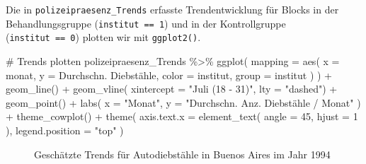 \documentclass[
  a4paper,
  DIV=11,
  oneside]{scrreprt}
\newenvironment{Shaded}{\begin{snugshade}}{\end{snugshade}}
\newcommand{\AttributeTok}[1]{\textcolor[rgb]{0.40,0.45,0.13}{#1}}
\newcommand{\CommentTok}[1]{\textcolor[rgb]{0.37,0.37,0.37}{#1}}
\newcommand{\DecValTok}[1]{\textcolor[rgb]{0.68,0.00,0.00}{#1}}
\newcommand{\FunctionTok}[1]{\textcolor[rgb]{0.28,0.35,0.67}{#1}}
\newcommand{\NormalTok}[1]{\textcolor[rgb]{0.00,0.23,0.31}{#1}}
\newcommand{\SpecialCharTok}[1]{\textcolor[rgb]{0.37,0.37,0.37}{#1}}
\newcommand{\StringTok}[1]{\textcolor[rgb]{0.13,0.47,0.30}{#1}}
\begin{document}
Die in \texttt{polizeipraesenz\_Trends} erfasste Trendentwicklung für
Blocks in der Behandlungsgruppe (\texttt{institut\ ==\ 1}) und in der
Kontrollgruppe (\texttt{institut\ ==\ 0}) plotten wir mit
\texttt{ggplot2()}.

\begin{Shaded}
\begin{Highlighting}[]
\CommentTok{\# Trends plotten}
\NormalTok{polizeipraesenz\_Trends }\SpecialCharTok{\%\textgreater{}\%}
  \FunctionTok{ggplot}\NormalTok{(}
    \AttributeTok{mapping =} \FunctionTok{aes}\NormalTok{(}
      \AttributeTok{x =}\NormalTok{ monat, }
      \AttributeTok{y =} \StringTok{\textasciigrave{}}\AttributeTok{Durchschn. Diebstähle}\StringTok{\textasciigrave{}}\NormalTok{, }
      \AttributeTok{color =}\NormalTok{ institut, }
      \AttributeTok{group =}\NormalTok{ institut}
\NormalTok{    )}
\NormalTok{  ) }\SpecialCharTok{+}
  \FunctionTok{geom\_line}\NormalTok{() }\SpecialCharTok{+}
  \FunctionTok{geom\_vline}\NormalTok{(}
    \AttributeTok{xintercept =} \StringTok{"Juli (18 {-} 31)"}\NormalTok{, }
    \AttributeTok{lty =} \StringTok{"dashed"}\NormalTok{) }\SpecialCharTok{+}
  \FunctionTok{geom\_point}\NormalTok{() }\SpecialCharTok{+}
  \FunctionTok{labs}\NormalTok{(}
    \AttributeTok{x =} \StringTok{"Monat"}\NormalTok{,}
    \AttributeTok{y =} \StringTok{"Durchschn. Anz. Diebstähle / Monat"}
\NormalTok{  ) }\SpecialCharTok{+}
  \FunctionTok{theme\_cowplot}\NormalTok{() }\SpecialCharTok{+}
  \FunctionTok{theme}\NormalTok{(}
    \AttributeTok{axis.text.x =} \FunctionTok{element\_text}\NormalTok{(}
      \AttributeTok{angle =} \DecValTok{45}\NormalTok{, }
      \AttributeTok{hjust =} \DecValTok{1}
\NormalTok{    ), }
    \AttributeTok{legend.position =} \StringTok{"top"}
\NormalTok{  )}
\end{Highlighting}
\end{Shaded}

\begin{figure}[t]


\caption{\label{fig-totrobtrends}Geschätzte Trends für Autodiebstähle in
Buenos Aires im Jahr 1994}

\end{figure}%
\end{document}
